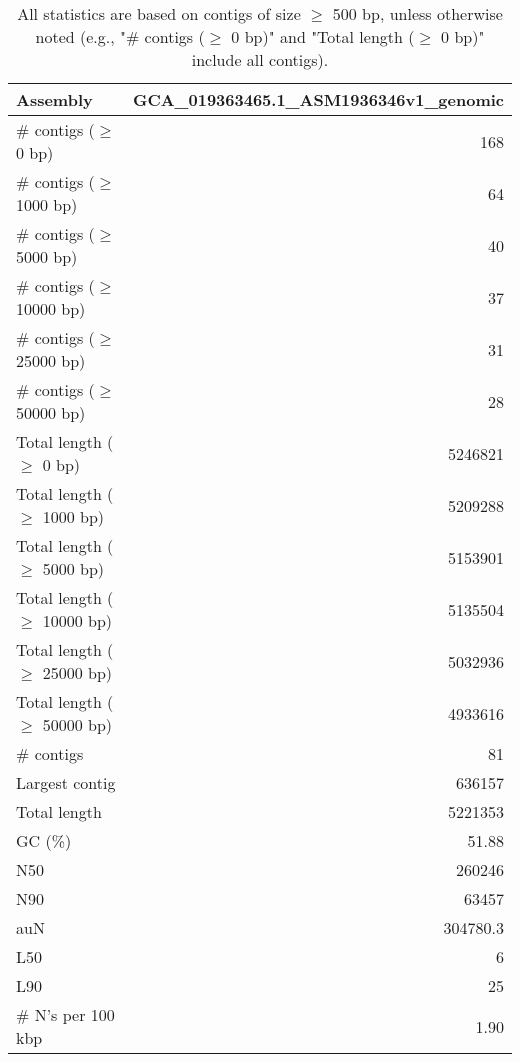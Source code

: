 \documentclass[12pt,a4paper]{article}
\begin{document}
\begin{table}[ht]
\begin{center}
\caption{All statistics are based on contigs of size $\geq$ 500 bp, unless otherwise noted (e.g., "\# contigs ($\geq$ 0 bp)" and "Total length ($\geq$ 0 bp)" include all contigs).}
\begin{tabular}{|l*{1}{|r}|}
\hline
Assembly & GCA\_019363465.1\_ASM1936346v1\_genomic \\ \hline
\# contigs ($\geq$ 0 bp) & 168 \\ \hline
\# contigs ($\geq$ 1000 bp) & 64 \\ \hline
\# contigs ($\geq$ 5000 bp) & 40 \\ \hline
\# contigs ($\geq$ 10000 bp) & 37 \\ \hline
\# contigs ($\geq$ 25000 bp) & 31 \\ \hline
\# contigs ($\geq$ 50000 bp) & 28 \\ \hline
Total length ($\geq$ 0 bp) & 5246821 \\ \hline
Total length ($\geq$ 1000 bp) & 5209288 \\ \hline
Total length ($\geq$ 5000 bp) & 5153901 \\ \hline
Total length ($\geq$ 10000 bp) & 5135504 \\ \hline
Total length ($\geq$ 25000 bp) & 5032936 \\ \hline
Total length ($\geq$ 50000 bp) & 4933616 \\ \hline
\# contigs & 81 \\ \hline
Largest contig & 636157 \\ \hline
Total length & 5221353 \\ \hline
GC (\%) & 51.88 \\ \hline
N50 & 260246 \\ \hline
N90 & 63457 \\ \hline
auN & 304780.3 \\ \hline
L50 & 6 \\ \hline
L90 & 25 \\ \hline
\# N's per 100 kbp & 1.90 \\ \hline
\end{tabular}
\end{center}
\end{table}
\end{document}
